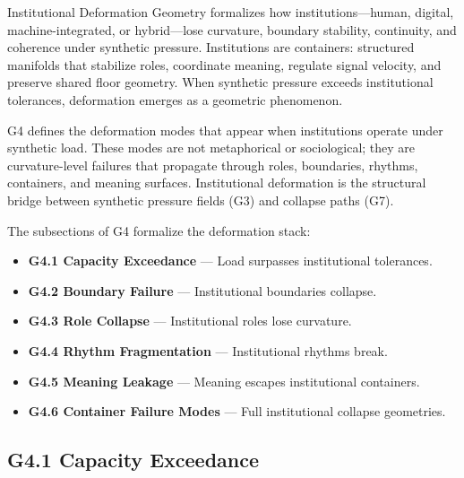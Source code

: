 
\medskip

\noindent Institutional Deformation Geometry formalizes how institutions—human,
digital, machine-integrated, or hybrid—lose curvature, boundary stability,
continuity, and coherence under synthetic pressure. Institutions are containers:
structured manifolds that stabilize roles, coordinate meaning, regulate signal
velocity, and preserve shared floor geometry. When synthetic pressure exceeds
institutional tolerances, deformation emerges as a geometric phenomenon.

\medskip

\noindent G4 defines the deformation modes that appear when institutions operate
under synthetic load. These modes are not metaphorical or sociological; they are
curvature-level failures that propagate through roles, boundaries, rhythms,
containers, and meaning surfaces. Institutional deformation is the structural
bridge between synthetic pressure fields (G3) and collapse paths (G7).

\medskip

\noindent The subsections of G4 formalize the deformation stack:

\begin{itemize}[leftmargin=1.2cm]
    \item \textbf{G4.1 Capacity Exceedance} — Load surpasses institutional
    tolerances.
    \item \textbf{G4.2 Boundary Failure} — Institutional boundaries collapse.
    \item \textbf{G4.3 Role Collapse} — Institutional roles lose curvature.
    \item \textbf{G4.4 Rhythm Fragmentation} — Institutional rhythms break.
    \item \textbf{G4.5 Meaning Leakage} — Meaning escapes institutional
    containers.
    \item \textbf{G4.6 Container Failure Modes} — Full institutional collapse
    geometries.
\end{itemize}

\medskip

\subsection*{G4.1 Capacity Exceedance}


